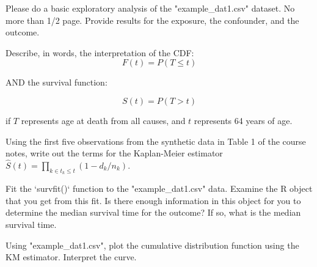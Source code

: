 \documentclass[12pt]{article}
\begin{document}
 Please do a basic exploratory analysis of the "example\_dat1.csv" dataset. No more than 1/2 page. Provide results for the exposure, the confounder, and the outcome.

 Describe, in words, the interpretation of the CDF: 
$$F(t) = P(T \leq t)$$

AND the survival function:

$$S(t) = P(T > t)$$

if $T$ represents age at death from all causes, and $t$ represents 64 years of age.

 Using the first five observations from the synthetic data in Table 1 of the course notes, write out the terms for the Kaplan-Meier estimator $\hat{S}(t) = \prod_{k \in t_k \leq t} (1 - d_k/n_k)$.

 Fit the `survfit()` function to the "example\_dat1.csv" data. Examine the R object that you get from this fit. Is there enough information in this object for you to determine the median survival time for the outcome? If so, what is the median survival time.

 Using "example\_dat1.csv", plot the cumulative distribution function using the KM estimator. Interpret the curve.
\end{document}
